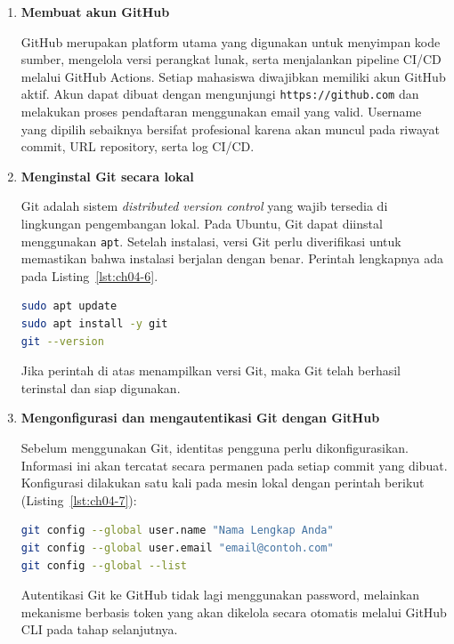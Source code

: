 \begin{enumerate}

  \item \textbf{Membuat akun GitHub}

  GitHub merupakan platform utama yang digunakan untuk menyimpan kode sumber,
  mengelola versi perangkat lunak, serta menjalankan pipeline CI/CD melalui
  GitHub Actions. Setiap mahasiswa diwajibkan memiliki akun GitHub aktif.
  Akun dapat dibuat dengan mengunjungi \texttt{https://github.com} dan
  melakukan proses pendaftaran menggunakan email yang valid. Username yang
  dipilih sebaiknya bersifat profesional karena akan muncul pada riwayat
  commit, URL repository, serta log CI/CD.

  \item \textbf{Menginstal Git secara lokal}

  Git adalah sistem \textit{distributed version control} yang wajib tersedia
  di lingkungan pengembangan lokal. Pada Ubuntu, Git dapat diinstal
  menggunakan \texttt{apt}. Setelah instalasi, versi Git perlu diverifikasi
  untuk memastikan bahwa instalasi berjalan dengan benar. Perintah lengkapnya ada pada Listing~\ref{lst:ch04-6}.

  \begin{lstlisting}[language=bash, caption={Memperbarui indeks paket}, label={lst:ch04-6}]
sudo apt update
sudo apt install -y git
git --version
  \end{lstlisting}

  Jika perintah di atas menampilkan versi Git, maka Git telah berhasil
  terinstal dan siap digunakan.

  \item \textbf{Mengonfigurasi dan mengautentikasi Git dengan GitHub}

  Sebelum menggunakan Git, identitas pengguna perlu dikonfigurasikan.
  Informasi ini akan tercatat secara permanen pada setiap commit yang dibuat.
  Konfigurasi dilakukan satu kali pada mesin lokal dengan perintah berikut (Listing~\ref{lst:ch04-7}):

  \begin{lstlisting}[language=bash, caption={Perintah git config --global user.name "Nama Lengkap Anda"}, label={lst:ch04-7}]
git config --global user.name "Nama Lengkap Anda"
git config --global user.email "email@contoh.com"
git config --global --list
  \end{lstlisting}

  Autentikasi Git ke GitHub tidak lagi menggunakan password, melainkan
  mekanisme berbasis token yang akan dikelola secara otomatis melalui
  GitHub CLI pada tahap selanjutnya.


\end{enumerate}
